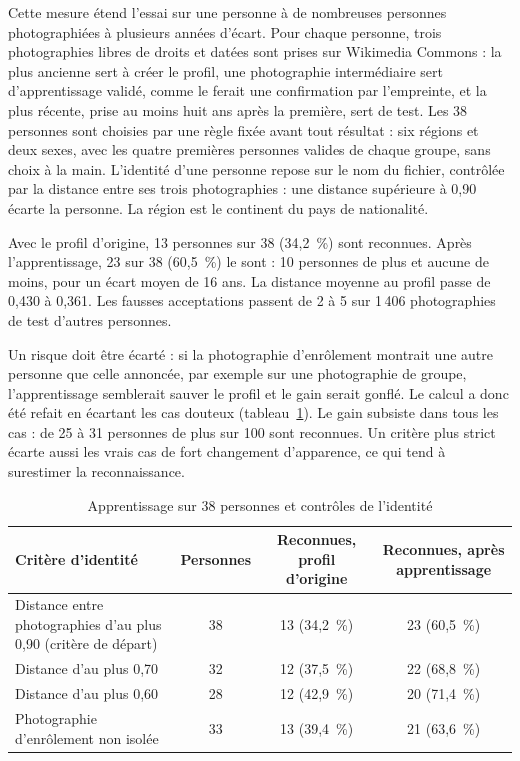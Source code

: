\begin{maj}
Cette mesure étend l'essai sur une personne à de nombreuses personnes photographiées à plusieurs années d'écart. Pour chaque personne, trois photographies libres de droits et datées sont prises sur Wikimedia Commons : la plus ancienne sert à créer le profil, une photographie intermédiaire sert d'apprentissage validé, comme le ferait une confirmation par l'empreinte, et la plus récente, prise au moins huit ans après la première, sert de test. Les 38 personnes sont choisies par une règle fixée avant tout résultat : six régions et deux sexes, avec les quatre premières personnes valides de chaque groupe, sans choix à la main. L'identité d'une personne repose sur le nom du fichier, contrôlée par la distance entre ses trois photographies : une distance supérieure à 0,90 écarte la personne. La région est le continent du pays de nationalité.

Avec le profil d'origine, 13 personnes sur 38 (34,2~\%) sont reconnues. Après l'apprentissage, 23 sur 38 (60,5~\%) le sont : 10 personnes de plus et aucune de moins, pour un écart moyen de 16 ans. La distance moyenne au profil passe de 0,430 à 0,361. Les fausses acceptations passent de 2 à 5 sur 1\,406 photographies de test d'autres personnes.

Un risque doit être écarté : si la photographie d'enrôlement montrait une autre personne que celle annoncée, par exemple sur une photographie de groupe, l'apprentissage semblerait sauver le profil et le gain serait gonflé. Le calcul a donc été refait en écartant les cas douteux (tableau~\ref{tab:trentehuit}). Le gain subsiste dans tous les cas : de 25 à 31 personnes de plus sur 100 sont reconnues. Un critère plus strict écarte aussi les vrais cas de fort changement d'apparence, ce qui tend à surestimer la reconnaissance.
\end{maj}

\begin{table}[H]
\centering
\caption{Apprentissage sur 38 personnes et contrôles de l'identité\majmark}\label{tab:trentehuit}
\small
\begin{tabularx}{\textwidth}{@{}Xccc@{}}
\toprule
\textbf{Critère d'identité} & \textbf{Personnes} & \textbf{Reconnues, profil d'origine} & \textbf{Reconnues, après apprentissage} \\
\midrule
Distance entre photographies d'au plus 0,90 (critère de départ) & 38 & 13 (34,2~\%) & 23 (60,5~\%) \\
Distance d'au plus 0,70 & 32 & 12 (37,5~\%) & 22 (68,8~\%) \\
Distance d'au plus 0,60 & 28 & 12 (42,9~\%) & 20 (71,4~\%) \\
Photographie d'enrôlement non isolée & 33 & 13 (39,4~\%) & 21 (63,6~\%) \\
\bottomrule
\end{tabularx}
\end{table}

